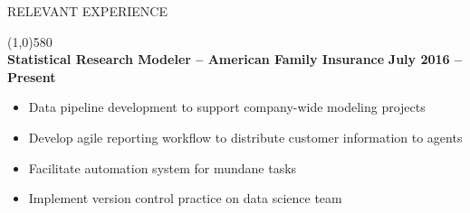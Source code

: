 \documentclass{article}
\begin{document}
\noindent \large{RELEVANT EXPERIENCE}\\ \begin{small}
\line(1,0){580}\\

	\noindent \textbf{Statistical Research Modeler -- American Family Insurance} \hfill \textbf{July 2016 -- Present}
	\begin{itemize}
		\item Data pipeline development to support company-wide modeling projects
		\item Develop agile reporting workflow to distribute customer information to agents
		\item Facilitate automation system for mundane tasks
		\item Implement version control practice on data science team
	\end{itemize}
	



\end{small}
\end{document}
